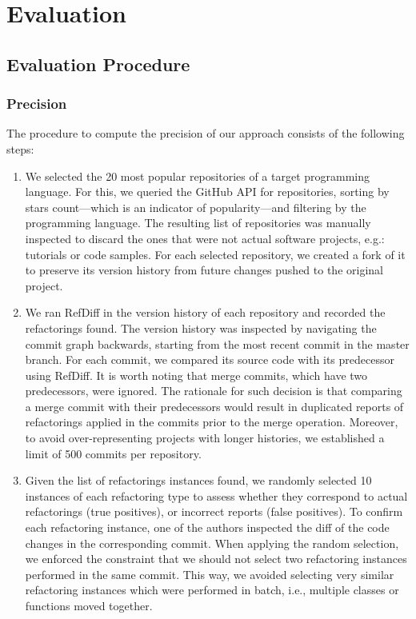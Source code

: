 \section{Evaluation}

\subsection{Evaluation Procedure}


\subsubsection{Precision}
\label{SecPrecisionProcedure}

The procedure to compute the precision of our approach consists of the following steps:

\begin{enumerate}  
\item We selected the 20 most popular repositories of a target programming language. For this, we queried the GitHub API for repositories, sorting by stars count---which is an indicator of popularity---and filtering by the programming language.
The resulting list of repositories was manually inspected to discard the ones that were not actual software projects, e.g.: tutorials or code samples.
For each selected repository, we created a fork of it to preserve its version history from future changes pushed to the original project.

\item We ran RefDiff in the version history of each repository and recorded the refactorings found.
The version history was inspected by navigating the commit graph backwards, starting from the most recent commit in the master branch.
For each commit, we compared its source code with its predecessor using RefDiff.
It is worth noting that merge commits, which have two predecessors, were ignored.
The rationale for such decision is that comparing a merge commit with their predecessors would result in duplicated reports of refactorings applied in the commits prior to the merge operation.
Moreover, to avoid over-representing projects with longer histories, we established a limit of 500 commits per repository.

\item Given the list of refactorings instances found, we randomly selected 10 instances of each refactoring type to assess whether they correspond to actual refactorings (true positives), or incorrect reports (false positives).
To confirm each refactoring instance, one of the authors inspected the diff of the code changes in the corresponding commit.
When applying the random selection, we enforced the constraint that we should not select two refactoring instances performed in the same commit.
This way, we avoided selecting very similar refactoring instances which were performed in batch, i.e., multiple classes or functions moved together.
\end{enumerate}

